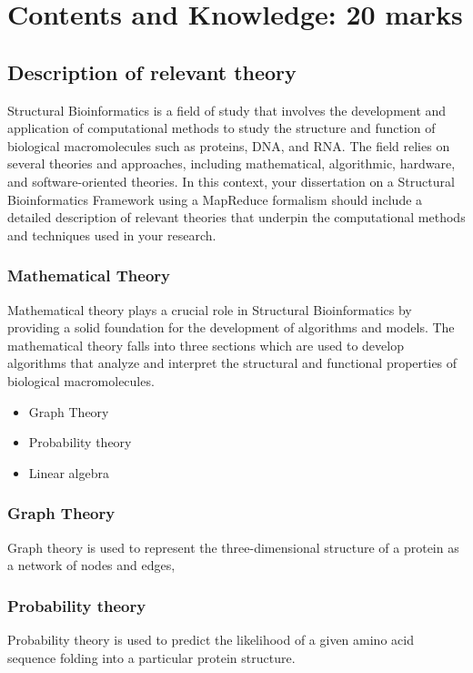 \documentclass[]{final_report}
\begin{document}
\section{Contents and Knowledge: 20 marks}
\subsection{Description of relevant theory}
Structural Bioinformatics is a field of study that involves the development and application of computational methods to study the structure and function of biological macromolecules such as proteins, DNA, and RNA. The field relies on several theories and approaches, including mathematical, algorithmic, hardware, and software-oriented theories. In this context, your dissertation on a Structural Bioinformatics Framework using a MapReduce formalism should include a detailed description of relevant theories that underpin the computational methods and techniques used in your research.
\subsubsection{Mathematical Theory}
Mathematical theory plays a crucial role in Structural Bioinformatics by providing a solid foundation for the development of algorithms and models. The mathematical theory falls into three sections which are used to develop algorithms that analyze and interpret the structural and functional properties of biological macromolecules.

\begin{itemize}
    \item Graph Theory
    \item Probability theory
    \item Linear algebra
\end{itemize}

\subsubsection{Graph Theory}

Graph theory is used to represent the three-dimensional structure of a protein as a network of nodes and edges, 

\subsubsection{Probability theory}

Probability theory is used to predict the likelihood of a given amino acid sequence folding into a particular protein structure.
\end{document}
